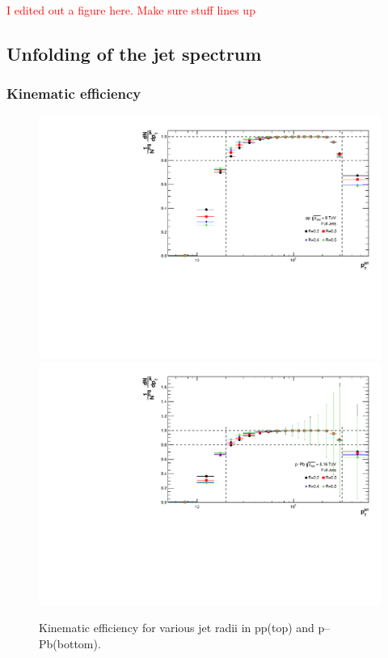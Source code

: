 \documentclass[ALICE]{ALICE_analysis_notes}
\newcommand{\pPb}{{\mbox{p--Pb}}\xspace}
\newcommand{\pp}{pp\xspace}
\begin{document}
\textcolor{red}{I edited out a figure here. Make sure stuff lines up}

\subsection{Unfolding of the jet spectrum}
\label{sec:unfolding}
\subsubsection{Kinematic efficiency}
\label{subsec:kinEff}

\begin{figure}
    \centering
    \includegraphics[width=15cm]{figures/KinematicEfficiency/EffKine.pdf}
    \includegraphics[width=15cm]{figures/pPbFigures/KinematicEfficiency/EffKine.pdf}
    \caption{Kinematic efficiency for various jet radii in \pp (top) and \pPb (bottom).}
    \label{fig:KinematicEfficiency}
\end{figure}
\end{document}

